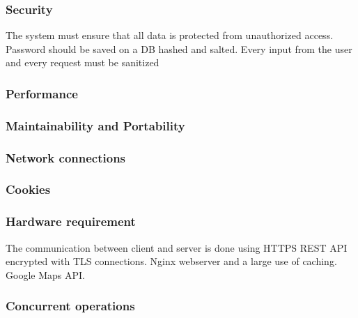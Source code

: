 \begin{itemize}
\subsubsection{Security}

The system must ensure that all data is protected from unauthorized
access. Password should be saved on a DB hashed and salted.
Every input from the user and every request must be sanitized 

\end{itemize}

\pagebreak{}




\subsubsection{Performance}


\subsubsection{Maintainability and Portability}




\subsubsection{Network connections}


\subsubsection{Cookies}



\subsubsection{Hardware requirement}
The communication between client and server is done using HTTPS REST API encrypted with TLS connections.
Nginx webserver and a large use of caching.
Google Maps API.



\subsubsection{Concurrent operations}

\pagebreak


